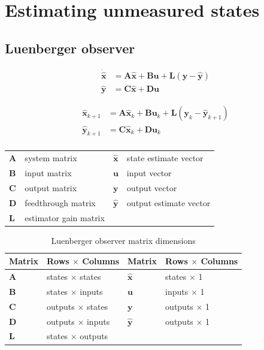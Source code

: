 \documentclass[10pt,conference,compsoc]{IEEEtran}
\newcommand{\mtx}[1] {\bm #1}
\begin{document}
\section{Estimating unmeasured states}

\subsection{Luenberger observer}

\begin{align}
  \dot{\hat{\mtx{x}}} &= \mtx{A}\hat{\mtx{x}} + \mtx{B}\mtx{u} +
    \mtx{L} (\mtx{y} - \hat{\mtx{y}}) \label{eq:s_obsv_x} \\
  \hat{\mtx{y}} &= \mtx{C}\hat{\mtx{x}} + \mtx{D}\mtx{u} \label{eq:s_obsv_y}
\end{align}

\begin{align}
  \hat{\mtx{x}}_{k+1} &= \mtx{A}\hat{\mtx{x}}_k + \mtx{B}\mtx{u}_k +
    \mtx{L} (\mtx{y}_k - \hat{\mtx{y}}_{k+1}) \label{eq:z_obsv_x} \\
  \hat{\mtx{y}}_{k+1} &= \mtx{C}\hat{\mtx{x}}_k +
    \mtx{D}\mtx{u}_k \label{eq:z_obsv_y} \\ \nonumber
\end{align}

\begin{table}[ht]
  \renewcommand{\arraystretch}{1.3}
  \centering
  \begin{tabulary}{\linewidth}{LLLL}
    $\mtx{A}$ & system matrix      & $\hat{\mtx{x}}$ & state estimate vector \\
    $\mtx{B}$ & input matrix       & $\mtx{u}$ & input vector \\
    $\mtx{C}$ & output matrix      & $\mtx{y}$ & output vector \\
    $\mtx{D}$ & feedthrough matrix & $\hat{\mtx{y}}$ & output estimate vector \\
    $\mtx{L}$ & estimator gain matrix & & \\
  \end{tabulary}
  \label{tab:obsv_def}
\end{table}

\begin{table}[ht]
  \caption{Luenberger observer matrix dimensions}
  \renewcommand{\arraystretch}{1.5}
  \centering
  \begin{tabular}{|ll|ll|}
    \hline
    \textbf{Matrix} & \textbf{Rows $\times$ Columns} &
    \textbf{Matrix} & \textbf{Rows $\times$ Columns} \\
    \hline
    $\mtx{A}$ & states $\times$ states & $\hat{\mtx{x}}$ & states $\times$ 1 \\
    $\mtx{B}$ & states $\times$ inputs & $\mtx{u}$ & inputs $\times$ 1 \\
    $\mtx{C}$ & outputs $\times$ states & $\mtx{y}$ & outputs $\times$ 1 \\
    $\mtx{D}$ & outputs $\times$ inputs & $\hat{\mtx{y}}$ & outputs $\times$ 1 \\
    $\mtx{L}$ & states $\times$ outputs &  &  \\
    \hline
  \end{tabular}
  \label{tab:luenberger_matrix_dims}
\end{table}
\end{document}

